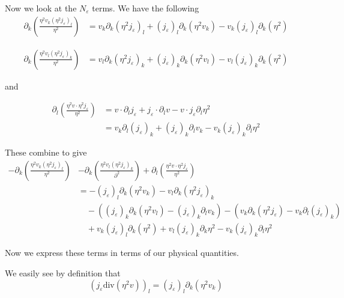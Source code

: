 \documentclass[a4paper]{article}
\renewcommand{\div}{\mathrm{div}}
\begin{document}
Now we look at the $N_\varepsilon$ terms.
We have the following
\begin{align}
  \partial_k \left( \frac{\eta^2 v_k (\eta^2 j_\varepsilon)_l}{\eta^2} \right) &= v_k \partial_k (\eta^2 j_\varepsilon)_l + (j_\varepsilon)_l
  \partial_k (\eta^2 v_k) - v_k (j_\varepsilon)_l \partial_k (\eta^2)
  \label{eqn:quot_rule3}
\end{align}

\begin{align}
  \partial_k \left( \frac{\eta^2 v_l (\eta^2 j_\varepsilon)_k}{\eta^2} \right) &= v_l \partial_k (\eta^2 j_\varepsilon)_k + (j_\varepsilon)_k
  \partial_k (\eta^2 v_l) - v_l (j_\varepsilon)_k \partial_k (\eta^2)
  \label{eqn:quot_rule4}
\end{align}

and

\begin{align}
  \partial_l \left( \frac{\eta^2 v \cdot \eta^2 j_\varepsilon}{\eta^2} \right) &= v \cdot \partial_l j_\varepsilon + j_\varepsilon \cdot \partial_l v
  - v \cdot j_\varepsilon \partial_l \eta^2 \nonumber \\
  &= v_k \partial_l (j_\varepsilon)_k + (j_\varepsilon)_k \partial_l v_k - v_k (j_\varepsilon)_k \partial_l \eta^2
  \label{eqn:quot_rule5}
\end{align}

These combine to give
\begin{align}
  - \partial_k \left( \frac{\eta^2 v_k (\eta^2 j_\varepsilon)_l}{\eta^2} \right) &- \partial_k \left( \frac{\eta^2 v_l (\eta^2
  j_\varepsilon)_k}{\partial^2} \right) + \partial_l \left( \frac{\eta^2 v \cdot \eta^2 j_\varepsilon}{\eta^2} \right) \\
  &= - (j_\varepsilon)_l \partial_k(\eta^2 v_k) - v_l \partial_k(\eta^2 j_\varepsilon)_k \nonumber \\
  &\quad - \left( (j_\varepsilon)_k \partial_k (\eta^2 v_l) - (j_\varepsilon)_k \partial_l v_k \right) - \left( v_k \partial_k (\eta^2 j_\varepsilon) - v_k \partial_l
  (j_\varepsilon)_k \right) \nonumber \\
  &\quad + v_k (j_\varepsilon)_l \partial_k (\eta^2) + v_l (j_\varepsilon)_k \partial_k \eta^2 - v_k (j_\varepsilon)_k \partial_l \eta^2
  \label{eqn:quot_rules2}
\end{align}

Now we express these terms in terms of our physical quantities.

We easily see by definition that
\begin{equation}
  (j_\varepsilon \div (\eta^2 v) )_l = (j_\varepsilon)_l \partial_k (\eta^2 v_k)
  \label{eqn:j_div_eta^2v}
\end{equation}
\end{document}
